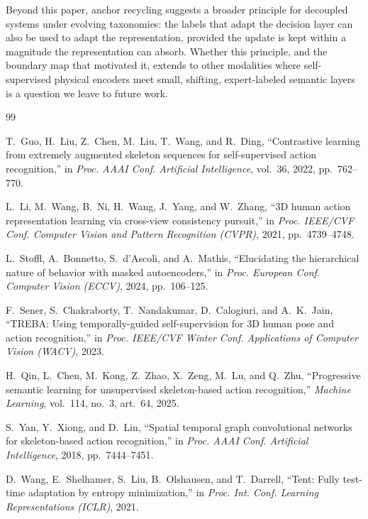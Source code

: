 \documentclass[preprint,12pt,number]{elsarticle}
\begin{document}
Beyond this paper, anchor recycling suggests a broader principle for
decoupled systems under evolving taxonomies: the labels that adapt the
decision layer can also be used to adapt the representation, provided the
update is kept within a magnitude the representation can absorb. Whether
this principle, and the boundary map that motivated it, extends to other
modalities where self-supervised physical encoders meet small, shifting,
expert-labeled semantic layers is a question we leave to future work.

\begin{thebibliography}{99}

T.~Guo, H.~Liu, Z.~Chen, M.~Liu, T.~Wang, and R.~Ding, ``Contrastive
learning from extremely augmented skeleton sequences for self-supervised
action recognition,'' in \emph{Proc. AAAI Conf. Artificial Intelligence}, vol.~36,
2022, pp.~762--770.

L.~Li, M.~Wang, B.~Ni, H.~Wang, J.~Yang, and W.~Zhang, ``3D human action
representation learning via cross-view consistency pursuit,'' in \emph{Proc.
IEEE/CVF Conf. Computer Vision and Pattern Recognition (CVPR)}, 2021,
pp.~4739--4748.

L.~Stoffl, A.~Bonnetto, S.~d'Ascoli, and A.~Mathis, ``Elucidating the
hierarchical nature of behavior with masked autoencoders,'' in \emph{Proc.
European Conf. Computer Vision (ECCV)}, 2024, pp.~106--125.

F.~Sener, S.~Chakraborty, T.~Nandakumar, D.~Calogiuri, and A.~K.~Jain,
``TREBA: Using temporally-guided self-supervision for 3D human pose and
action recognition,'' in \emph{Proc. IEEE/CVF Winter Conf. Applications of
Computer Vision (WACV)}, 2023.

H.~Qin, L.~Chen, M.~Kong, Z.~Zhao, X.~Zeng, M.~Lu, and Q.~Zhu,
``Progressive semantic learning for unsupervised skeleton-based action
recognition,'' \emph{Machine Learning}, vol.~114, no.~3, art.~64, 2025.

S.~Yan, Y.~Xiong, and D.~Lin, ``Spatial temporal graph convolutional
networks for skeleton-based action recognition,'' in \emph{Proc. AAAI Conf.
Artificial Intelligence}, 2018, pp.~7444--7451.

D.~Wang, E.~Shelhamer, S.~Liu, B.~Olshausen, and T.~Darrell, ``Tent: Fully
test-time adaptation by entropy minimization,'' in \emph{Proc. Int. Conf.
Learning Representations (ICLR)}, 2021.


\end{thebibliography}
\end{document}
